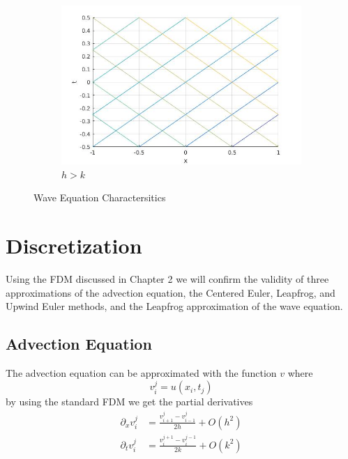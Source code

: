 \begin{figure}[H]
\begin{subfigure}[b]{0.3\textwidth}
  \includegraphics[width=\textwidth]{Images/wave_hgk.jpg}
  \caption{$h>k$}
  \label{fig:wci3}
\end{subfigure}
\caption{Wave Equation Charactersitics}
\label{fig:wavecoordimg}
\end{figure}
\section{Discretization}
Using the FDM discussed in Chapter 2 we will confirm the validity of three approximations of the advection equation, the Centered Euler, Leapfrog, and Upwind Euler methods, and the Leapfrog approximation of the wave equation.
\subsection{Advection Equation}
The advection equation can be approximated with the function $v$ where
\begin{equation}
v_i^j = u(x_i,t_j)
\end{equation}
by using the standard FDM we get the partial derivatives
\begin{align}
    \partial_xv_i^j &= \frac{v_{i+1}^j - v_{i-1}^j}{2h} + O(h^2)\label{advfdmx} \\
    \partial_tv_i^j &= \frac{v_i^{j+1} - v_i^{j-1}}{2k} + O(k^2)\label{advfdmt}
\end{align}

